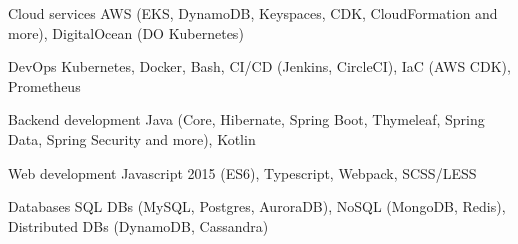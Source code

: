 

\begin{cvskills}

  \cvskill
    {Cloud services} %
    {AWS (EKS, DynamoDB, Keyspaces, CDK, CloudFormation and more), DigitalOcean (DO Kubernetes)} %

  \cvskill
    {DevOps} %
    {Kubernetes, Docker, Bash, CI/CD (Jenkins, CircleCI), IaC (AWS CDK), Prometheus} %

  \cvskill
    {Backend development} %
    {Java (Core, Hibernate, Spring Boot, Thymeleaf, Spring Data, Spring Security and more), Kotlin} %

  \cvskill
    {Web development} %
    {Javascript 2015 (ES6), Typescript, Webpack, SCSS/LESS} %

  \cvskill
  {Databases} %
  {SQL DBs (MySQL, Postgres, AuroraDB), NoSQL (MongoDB, Redis), Distributed DBs (DynamoDB, Cassandra)} %

\end{cvskills}
